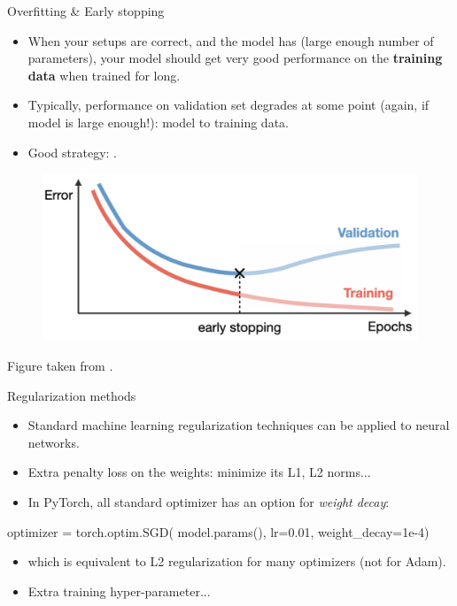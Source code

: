 \begin{frame}{Overfitting \& Early stopping}
\vspace{-3mm}
\begin{itemize}
\item When your setups are correct, and the model has  (large enough number of parameters), your model should get very good performance on the \textbf{training data} when trained for long.
\item Typically, performance on validation set degrades at some point (again, if model is large enough!): model  to training data.
\item Good strategy: .
\end{itemize}
\begin{figure}
\hspace{-10mm}
                        \centering
                        \includegraphics[width=.7\linewidth]{./figures/overfit.png}
\end{figure}
\scriptsize{Figure taken from .}
\end{frame}

\begin{frame}[fragile]{Regularization methods}

\begin{itemize}
\item Standard machine learning regularization techniques can be applied to neural networks.
\item Extra penalty loss on the weights: minimize its L1, L2 norms...
\item In PyTorch, all standard optimizer has an option for \textit{weight decay}:
\end{itemize}
\begin{python}
optimizer = torch.optim.SGD(
    model.params(), lr=0.01, weight_decay=1e-4)
\end{python}
\begin{itemize}
\item which is equivalent to L2 regularization for many optimizers (not for Adam).
\item Extra training hyper-parameter...
\end{itemize}
\end{frame}

